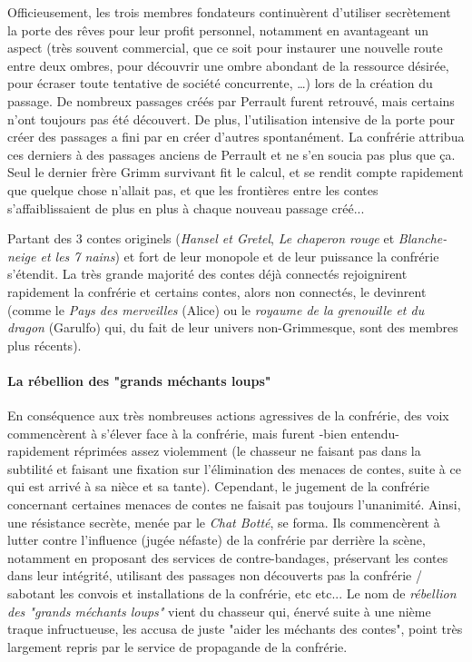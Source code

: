 {	\par Officieusement, les trois membres fondateurs continuèrent d'utiliser secrètement la porte des rêves pour leur profit personnel, notamment en avantageant un aspect (très souvent commercial, que ce soit pour instaurer une nouvelle route entre deux ombres, pour découvrir une ombre abondant de la ressource désirée, pour écraser toute tentative de société concurrente, \dots) lors de la création du passage. De nombreux passages créés par Perrault furent retrouvé, mais certains n'ont toujours pas été découvert. De plus, l'utilisation intensive de la porte pour créer des passages a fini par en créer d'autres spontanément. La confrérie attribua ces derniers à des passages anciens de Perrault et ne s'en soucia pas plus que ça. Seul le dernier frère Grimm survivant fit le calcul, et se rendit compte rapidement que quelque chose n'allait pas, et que les frontières entre les contes s'affaiblissaient de plus en plus à chaque nouveau passage créé...
		
	\par Partant des 3 contes originels (\emph{Hansel et Gretel}, \emph{Le chaperon rouge} et \emph{Blanche-neige et les 7 nains}) et fort de leur monopole et de leur puissance la confrérie s'étendit. La très grande majorité des contes déjà connectés rejoignirent rapidement la confrérie et certains contes, alors non connectés, le devinrent (comme le \emph{Pays des merveilles} (Alice) ou le \emph{royaume de la grenouille et du dragon} (Garulfo) qui, du fait de leur univers non-Grimmesque, sont des membres plus récents).
	
	
	\paragraph{La rébellion des "grands méchants loups"} En conséquence aux très nombreuses actions agressives de la confrérie, des voix commencèrent à s'élever face à la confrérie, mais furent -bien entendu- rapidement réprimées assez violemment (le chasseur ne faisant pas dans la subtilité et faisant une fixation sur l'élimination des menaces de contes, suite à ce qui est arrivé à sa nièce et sa tante). Cependant, le jugement de la confrérie concernant certaines menaces de contes ne faisait pas toujours l'unanimité. Ainsi, une résistance secrète, menée par le \emph{Chat Botté}, se forma. Ils commencèrent à lutter contre l'influence (jugée néfaste) de la confrérie par derrière la scène, notamment en proposant des services de contre-bandages, préservant les contes dans leur intégrité, utilisant des passages non découverts pas la confrérie / sabotant les convois et installations de la confrérie, etc etc... Le nom de \emph{rébellion des "grands méchants loups"} vient du chasseur qui, énervé suite à une nième traque infructueuse, les accusa de juste "aider les méchants des contes", point très largement repris par le service de propagande de la confrérie.
	
}
